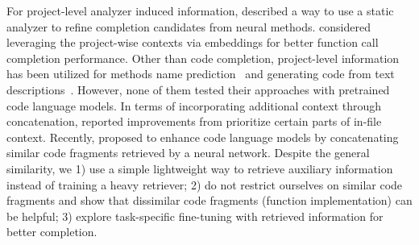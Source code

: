 For project-level analyzer induced information, \citet{svyatkovskiy2021fast} described a way to use a static analyzer to refine completion candidates from neural methods.
\citet{weyssow2020combining} considered leveraging the project-wise contexts via embeddings for better function call completion performance.
Other than code completion, project-level information has been utilized for methods name prediction~\citep{wang2021lightweight} and generating code from text descriptions~\citep{lyu2021embedding}.
However, none of them tested their approaches with pretrained code language models. 
In terms of incorporating additional context through concatenation,
\citet{clement2021long} reported improvements from prioritize certain parts of in-file context.
Recently, \citet{lu2022reacc} proposed to enhance code language models by concatenating similar code fragments retrieved by a neural network. Despite the general similarity, we 1) use a simple lightweight way to retrieve auxiliary information instead of training a heavy retriever; 2) do not restrict ourselves on similar code fragments and show that dissimilar code fragments (function implementation) can be helpful; 3) explore task-specific fine-tuning with retrieved information for better completion.




